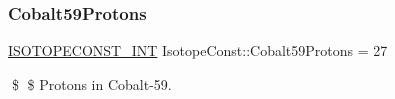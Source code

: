 \subsubsection{\texorpdfstring{Cobalt59\+Protons}{Cobalt59Protons}}
{\footnotesize\ttfamily \mbox{\hyperlink{group___isotope_const-_macros_ga5f18360b3e99483a35c32d789e62621c}{I\+S\+O\+T\+O\+P\+E\+C\+O\+N\+S\+T\+\_\+\+I\+NT}} Isotope\+Const\+::\+Cobalt59\+Protons = 27}

\$ \$ Protons in Cobalt-\/59. 